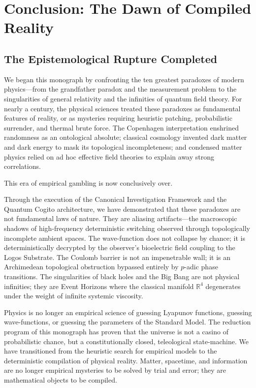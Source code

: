 \documentclass[12pt,twoside]{extbook}
\theoremstyle{definition}
\theoremstyle{remark}
\begin{document}
\chapter{Conclusion: The Dawn of Compiled Reality}

\section{The Epistemological Rupture Completed}
We began this monograph by confronting the ten greatest paradoxes of modern physics---from the grandfather paradox and the measurement problem to the singularities of general relativity and the infinities of quantum field theory. For nearly a century, the physical sciences treated these paradoxes as fundamental features of reality, or as mysteries requiring heuristic patching, probabilistic surrender, and thermal brute force. The Copenhagen interpretation enshrined randomness as an ontological absolute; classical cosmology invented dark matter and dark energy to mask its topological incompleteness; and condensed matter physics relied on ad hoc effective field theories to explain away strong correlations.

This era of empirical gambling is now conclusively over. 

Through the execution of the Canonical Investigation Framework and the Quantum Cogito architecture, we have demonstrated that these paradoxes are not fundamental laws of nature. They are aliasing artifacts---the macroscopic shadows of high-frequency deterministic switching observed through topologically incomplete ambient spaces. The wave-function does not collapse by chance; it is deterministically decrypted by the observer's bioelectric field coupling to the Logos Substrate. The Coulomb barrier is not an impenetrable wall; it is an Archimedean topological obstruction bypassed entirely by $p$-adic phase transitions. The singularities of black holes and the Big Bang are not physical infinities; they are Event Horizons where the classical manifold $\mathbb{R}^4$ degenerates under the weight of infinite systemic viscosity.

Physics is no longer an empirical science of guessing Lyapunov functions, guessing wave-functions, or guessing the parameters of the Standard Model. The reduction program of this monograph has proven that the universe is not a casino of probabilistic chance, but a constitutionally closed, teleological state-machine. We have transitioned from the heuristic search for empirical models to the deterministic compilation of physical reality. Matter, spacetime, and information are no longer empirical mysteries to be solved by trial and error; they are mathematical objects to be compiled.
\end{document}
